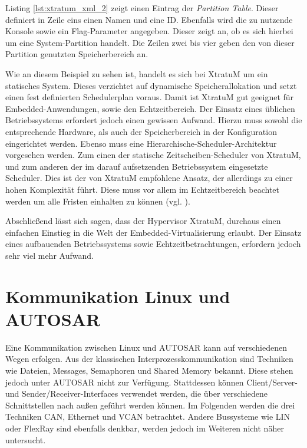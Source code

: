 \documentclass[
  a4paper,					    %
  twoside,
  DIV=calc,     				%
  bibliography=totoc,
  cleardoublepage=empty,
  ngerman,     					%
  final       					%
]{scrbook}
\begin{document}
Listing \ref{lst:xtratum_xml_2} zeigt einen Eintrag der \emph{Partition Table}. Dieser definiert in Zeile eins einen Namen und eine ID. Ebenfalls wird die zu nutzende Konsole sowie ein Flag-Parameter angegeben. Dieser zeigt an, ob es sich hierbei um eine System-Partition handelt. Die Zeilen zwei bis vier geben den von dieser Partition genutzten Speicherbereich an.

Wie an diesem Beispiel zu sehen ist, handelt es sich bei XtratuM um ein statisches System. Dieses verzichtet auf dynamische Speicherallokation und setzt einen fest definierten Schedulerplan voraus. Damit ist XtratuM gut geeignet für Embedded-Anwendungen, sowie den Echtzeitbereich. Der Einsatz eines üblichen Betriebssystems erfordert jedoch einen gewissen Aufwand. Hierzu muss sowohl die entsprechende Hardware, als auch der Speicherbereich in der Konfiguration eingerichtet werden. Ebenso muss eine Hierarchische-Scheduler-Architektur vorgesehen werden. Zum einen der statische Zeitscheiben-Scheduler von XtratuM, und zum anderen der im darauf aufsetzenden Betriebssystem eingesetzte Scheduler. Dies ist der von XtratuM empfohlene Ansatz, der allerdings zu einer hohen Komplexität führt. Diese muss vor allem im Echtzeitbereich beachtet werden um alle Fristen einhalten zu können (vgl. \cite{two_lvl_sched}).

Abschließend lässt sich sagen, dass der Hypervisor XtratuM, durchaus einen einfachen Einstieg in die Welt der Embedded-Virtualisierung erlaubt. Der Einsatz eines aufbauenden Betriebssystems sowie Echtzeitbetrachtungen, erfordern jedoch sehr viel mehr Aufwand.






\section{Kommunikation Linux und AUTOSAR}
\label{sec:Kommunikation_L_A}
Eine Kommunikation zwischen Linux und AUTOSAR kann auf verschiedenen Wegen erfolgen. Aus der klassischen Interprozesskommunikation sind Techniken wie Dateien, Messages, Semaphoren und Shared Memory bekannt. Diese stehen jedoch unter AUTOSAR nicht zur Verfügung. Stattdessen können Client/Server- und Sender/Receiver-Interfaces verwendet werden, die über verschiedene Schnittstellen nach außen geführt werden können. Im Folgenden werden die drei Techniken CAN, Ethernet und VCAN betrachtet. Andere Bussysteme wie LIN oder FlexRay sind ebenfalls denkbar, werden jedoch im Weiteren nicht näher untersucht.
\end{document}
